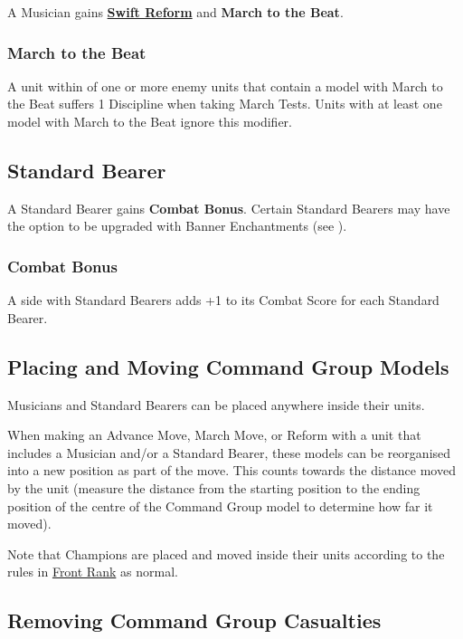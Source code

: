 A Musician gains \hyperref[swift_reform]{\textbf{Swift Reform}} and \textbf{March to the Beat}.

\subsubsection{March to the Beat}
\label{march_to_the_beat}

A unit within  of one or more enemy units that contain a model with March to the Beat suffers \minuss{}1 Discipline when taking March Tests. Units with at least one model with March to the Beat ignore this modifier.

\subsection{Standard Bearer}
\label{standard_bearer}

A Standard Bearer gains \textbf{Combat Bonus}. Certain Standard Bearers may have the option to be upgraded with Banner Enchantments (see ).

\subsubsection{Combat Bonus}
\label{combat_bonus_CG}

A side with Standard Bearers adds +1 to its Combat Score for each Standard Bearer.

\subsection{Placing and Moving Command Group Models}
\label{moving_command_group_models}

Musicians and Standard Bearers can be placed anywhere inside their units.

When making an Advance Move, March Move, or Reform with a unit that includes a Musician and/or a Standard Bearer, these models can be reorganised into a new position as part of the move. This counts towards the distance moved by the unit (measure the distance from the starting position to the ending position of the centre of the Command Group model to determine how far it moved).

Note that Champions are placed and moved inside their units according to the rules in \hyperref[front_rank]{Front Rank} as normal.

\subsection{Removing Command Group Casualties}
\label{removing_command_group_casualties}

